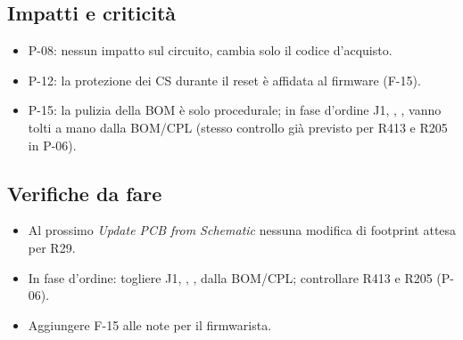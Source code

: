 \subsection{Impatti e criticità}
\begin{tcolorbox}[enhanced,breakable,colback=boxokbg,colframe=boxok,boxrule=0.8pt,left=7pt,right=6pt,top=4pt,bottom=4pt,
  title={\sffamily\bfseries Impatti},fonttitle=\small,coltitle=white,colbacktitle=boxok]
\begin{itemize}
\item P-08: nessun impatto sul circuito, cambia solo il codice d'acquisto.
\item P-12: la protezione dei CS durante il reset è affidata al firmware (F-15).
\item P-15: la pulizia della BOM è solo procedurale; in fase d'ordine J1, , ,  vanno tolti a mano dalla BOM/CPL (stesso controllo già previsto per R413 e R205 in P-06).
\end{itemize}
\end{tcolorbox}

\subsection{Verifiche da fare}
\begin{itemize}
\item Al prossimo \emph{Update PCB from Schematic} nessuna modifica di footprint attesa per R29.
\item In fase d'ordine: togliere J1, , ,  dalla BOM/CPL; controllare R413 e R205 (P-06).
\item Aggiungere F-15 alle note per il firmwarista.
\end{itemize}
